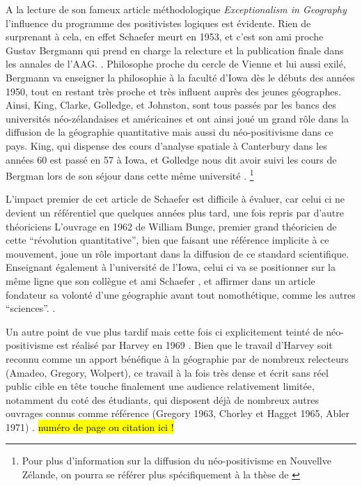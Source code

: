A la lecture de son fameux article méthodologique \textit{Exceptionalism in Geography} l'influence du programme des positivistes logiques est évidente. Rien de surprenant à cela, en effet Schaefer meurt en 1953, et c'est son ami proche Gustav Bergmann qui prend en charge la relecture et la publication finale dans les annales de l'AAG. \autocite[32]{Gregory1978}. Philosophe proche du cercle de Vienne et lui aussi exilé, Bergmann va enseigner la philosophie à la faculté d'Iowa dès le débuts des années 1950, tout en restant très proche et très influent auprès des jeunes géographes.\autocite[192]{Buttimer1983} Ainsi, King, Clarke, Golledge, et Johnston, sont tous passés par les bancs des universités néo-zélandaises et américaines et ont ainsi joué un grand rôle dans la diffusion de la géographie quantitative mais aussi du néo-positivisme dans ce pays. King, qui dispense des cours d'analyse spatiale à Canterbury dans les années 60 est passé en 57 à Iowa, et Golledge nous dit avoir suivi les cours de Bergman lors de son séjour dans cette même université \autocite[95-96]{Bailly2000}. \footnote{Pour plus d'information sur la diffusion du néo-positivisme en Nouvellve Zélande, on pourra se référer plus spécifiquement à la thèse de \textcite{Hammond1992}}

L'impact premier de cet article de Schaefer est difficile à évaluer, car celui ci ne devient un référentiel que quelques années plus tard, une fois repris par d'autre théoriciens \autocite[32]{Gregory1978} L'ouvrage en 1962 de William Bunge, premier grand théoricien de cette \enquote{révolution quantitative}, bien que faisant une référence implicite à ce mouvement, joue un rôle important dans la diffusion de ce standard scientifique. Enseignant également à l'université de l'Iowa, celui ci va se positionner sur la même ligne que son collègue et ami Schaefer \autocite{Goodchild2001}, et affirmer dans un article fondateur \autocite{Bunge1962} sa volonté d'une géographie avant tout nomothétique, comme les autres \enquote{sciences}. \autocite{Bunge1979} \autocite{Claval2003} \autocite[429-430]{Gregory2009}. 

Un autre point de vue plus tardif mais cette fois ci explicitement teinté de néo-positivisme est réalisé par Harvey en 1969 \autocite{Harvey1969}. Bien que le travail d'Harvey soit reconnu comme un apport bénéfique à la géographie par de nombreux relecteurs (Amadeo, Gregory, Wolpert), ce travail à la fois très dense et écrit sans réel public cible en tête touche finalement une audience relativement limitée, notamment du coté des étudiants, qui disposent déjà de nombreux autres ouvrages connus comme référence (Gregory 1963, Chorley et Hagget 1965, Abler 1971) \autocite{Johnston2008}. \hl{numéro de page ou citation ici !}

